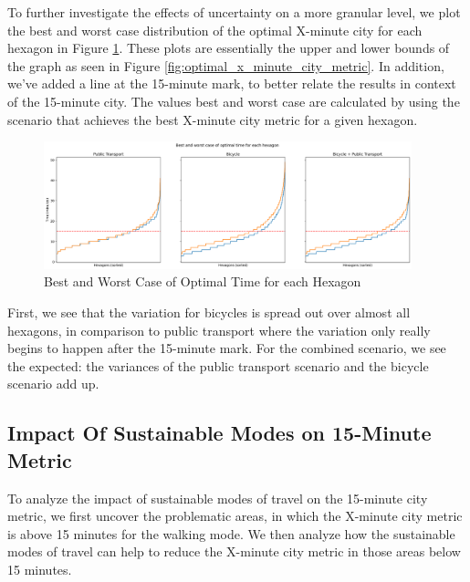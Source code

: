 To further investigate the effects of uncertainty on a more granular level, we plot the best and worst case distribution of the optimal X-minute city for each hexagon in Figure \ref{fig:best_and_worst_case_of_optimal_time_for_each_hexagon}.
These plots are essentially the upper and lower bounds of the graph as seen in Figure \ref{fig:optimal_x_minute_city_metric}.
In addition, we've added a line at the 15-minute mark, to better relate the results in context of the 15-minute city.
The values best and worst case are calculated by using the scenario that achieves the best X-minute city metric for a given hexagon.
\begin{figure}
  \begin{center}
    \includegraphics[width=0.95\textwidth]{Figures/results/uncertainty/optimal_best_worst_case}
  \end{center}
  \caption{Best and Worst Case of Optimal Time for each Hexagon}
  \label{fig:best_and_worst_case_of_optimal_time_for_each_hexagon}
\end{figure}
First, we see that the variation for bicycles is spread out over almost all hexagons, in comparison to public transport where the variation only really begins to happen after the 15-minute mark.
For the combined scenario, we see the expected: the variances of the public transport scenario and the bicycle scenario add up.

\subsection{Impact Of Sustainable Modes on 15-Minute Metric}
\label{subsec:impact_of_sustainable_modes_on_15_minute_metric}

To analyze the impact of sustainable modes of travel on the 15-minute city metric, we first uncover the problematic areas, in which the X-minute city metric is above 15 minutes for the walking mode.
We then analyze how the sustainable modes of travel can help to reduce the X-minute city metric in those areas below 15 minutes.

